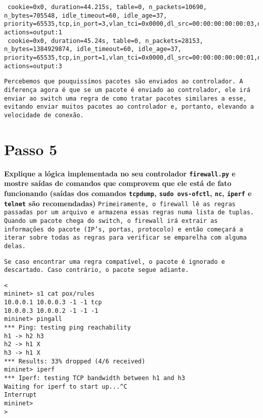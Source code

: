 \documentclass[12pt,letterpaper]{article}
\begin{document}
\begin{verbatim}
 cookie=0x0, duration=44.215s, table=0, n_packets=10690, n_bytes=705548, idle_timeout=60, idle_age=37, priority=65535,tcp,in_port=3,vlan_tci=0x0000,dl_src=00:00:00:00:00:03,dl_dst=00:00:00:00:00:01,nw_src=10.0.0.3,nw_dst=10.0.0.1,nw_tos=0,tp_src=5001,tp_dst=35981 actions=output:1
 cookie=0x0, duration=45.24s, table=0, n_packets=28153, n_bytes=1384929874, idle_timeout=60, idle_age=37, priority=65535,tcp,in_port=1,vlan_tci=0x0000,dl_src=00:00:00:00:00:01,dl_dst=00:00:00:00:00:03,nw_src=10.0.0.1,nw_dst=10.0.0.3,nw_tos=0,tp_src=35981,tp_dst=5001 actions=output:3
\end{verbatim}


\texttt{Percebemos que pouquissímos pacotes são enviados ao controlador. A \newline diferença agora é que se um pacote é enviado ao controlador, ele irá enviar ao switch uma regra de como tratar pacotes similares a esse, evitando enviar muitos pacotes ao controlador e, portanto, elevando a velocidade de conexão. }









 


 

\section{Passo 5}

\textbf{Explique a lógica implementada no seu controlador
\texttt{firewall.py} e mostre saídas de comandos que comprovem que ele
está de fato funcionando (saídas dos comandos \texttt{tcpdump},
\texttt{sudo ovs-ofctl}, \texttt{nc}, \texttt{iperf} e \texttt{telnet}
são recomendadas)}
\newline\newline
\texttt{Primeiramente, o firewall lê as regras passadas por um arquivo e armazena essas regras numa lista de tuplas. Quando um pacote chega do switch, o firewall irá extrair as informações do pacote (IP's, portas, protocolo) e então começará a iterar sobre todas as regras para verificar se emparelha com alguma delas.  }
\newline

\texttt{Se caso encontrar uma regra compatível, o pacote é ignorado e descartado. Caso contrário, o pacote segue adiante.}


\begin{verbatim}
<
mininet> s1 cat pox/rules
10.0.0.1 10.0.0.3 -1 -1 tcp
10.0.0.3 10.0.0.2 -1 -1 -1
mininet> pingall
*** Ping: testing ping reachability
h1 -> h2 h3 
h2 -> h1 X 
h3 -> h1 X 
*** Results: 33% dropped (4/6 received)
mininet> iperf
*** Iperf: testing TCP bandwidth between h1 and h3
Waiting for iperf to start up...^C
Interrupt
mininet>  
>
\end{verbatim}
\end{document}
